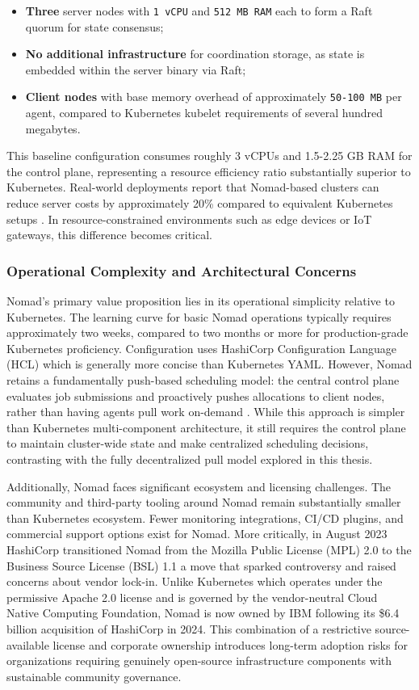 \begin{itemize}
\item \textbf{Three} server nodes with \texttt{1 vCPU} and \texttt{512 MB RAM} each to form a Raft \cite{ongaro2014raft} quorum for state consensus;
\item \textbf{No additional infrastructure} for coordination storage, as state is embedded within the server binary via Raft;
\item \textbf{Client nodes} with base memory overhead of approximately \texttt{50-100 MB} per agent, compared to Kubernetes kubelet requirements of several hundred megabytes.
\end{itemize}

This baseline configuration consumes roughly 3 vCPUs and 1.5-2.25 GB RAM for the control plane, representing a resource efficiency ratio substantially superior to Kubernetes. Real-world deployments report that Nomad-based clusters can reduce server costs by approximately 20\% compared to equivalent Kubernetes setups \cite{nomad_docs}. In resource-constrained environments such as edge devices or IoT gateways, this difference becomes critical.

\subsubsection{Operational Complexity and Architectural Concerns}
Nomad's primary value proposition lies in its operational simplicity relative to Kubernetes. The learning curve for basic Nomad operations typically requires approximately two weeks, compared to two months or more for production-grade Kubernetes proficiency. Configuration uses HashiCorp Configuration Language (HCL) which is generally more concise than Kubernetes YAML. However, Nomad retains a fundamentally push-based scheduling model: the central control plane evaluates job submissions and proactively pushes allocations to client nodes, rather than having agents pull work on-demand \cite{nomad_docs}. While this approach is simpler than Kubernetes multi-component architecture, it still requires the control plane to maintain cluster-wide state and make centralized scheduling decisions, contrasting with the fully decentralized pull model explored in this thesis.

Additionally, Nomad faces significant ecosystem and licensing challenges. The community and third-party tooling around Nomad remain substantially smaller than Kubernetes ecosystem. Fewer monitoring integrations, CI/CD plugins, and commercial support options exist for Nomad. More critically, in August 2023 HashiCorp transitioned Nomad from the Mozilla Public License (MPL) 2.0 to the Business Source License (BSL) 1.1 a move that sparked controversy and raised concerns about vendor lock-in. Unlike Kubernetes which operates under the permissive Apache 2.0 license and is governed by the vendor-neutral Cloud Native Computing Foundation, Nomad is now owned by IBM following its \$6.4 billion acquisition of HashiCorp in 2024. This combination of a restrictive source-available license and corporate ownership introduces long-term adoption risks for organizations requiring genuinely open-source infrastructure components with sustainable community governance.

